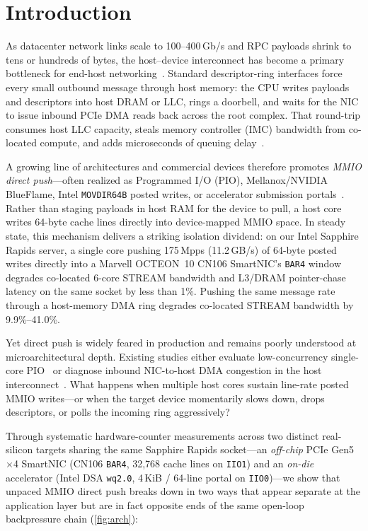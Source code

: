 \section{Introduction}
\label{sec:intro}

As datacenter network links scale to 100--400\,Gb/s and RPC payloads shrink to tens or hundreds of bytes, the host--device interconnect has become a primary bottleneck for end-host networking~\cite{neugebauer2018pcie,agarwal2023hostcc,vuppalapati2024hostnet,sadok2023enso}. Standard descriptor-ring interfaces force every small outbound message through host memory: the CPU writes payloads and descriptors into host DRAM or LLC, rings a doorbell, and waits for the NIC to issue inbound PCIe DMA reads back across the root complex. That round-trip consumes host LLC capacity, steals memory controller (IMC) bandwidth from co-located compute, and adds microseconds of queuing delay~\cite{farshin2020ddio,liu2025ceio}.

A growing line of architectures and commercial devices therefore promotes \emph{MMIO direct push}---often realized as Programmed I/O (PIO), Mellanox/NVIDIA BlueFlame, Intel \texttt{MOVDIR64B} posted writes, or accelerator submission portals~\cite{kalia2016rdma,liew2025hotos,ruzhanskaia2024pio,inteldsa2023}. Rather than staging payloads in host RAM for the device to pull, a host core writes 64-byte cache lines directly into device-mapped MMIO space. In steady state, this mechanism delivers a striking isolation dividend: on our Intel Sapphire Rapids server, a single core pushing 175\,Mpps (11.2\,GB/s) of 64-byte posted writes directly into a Marvell OCTEON~10 CN106 SmartNIC's \texttt{BAR4} window degrades co-located 6-core STREAM bandwidth and L3/DRAM pointer-chase latency on the same socket by less than 1\%. Pushing the same message rate through a host-memory DMA ring degrades co-located STREAM bandwidth by 9.9\%--41.0\%.

Yet direct push is widely feared in production and remains poorly understood at microarchitectural depth. Existing studies either evaluate low-concurrency single-core PIO~\cite{liew2025hotos,kalia2016rdma} or diagnose inbound NIC-to-host DMA congestion in the host interconnect~\cite{agarwal2023hostcc,vuppalapati2024hostnet,liu2023hostping}. What happens when multiple host cores sustain line-rate posted MMIO writes---or when the target device momentarily slows down, drops descriptors, or polls the incoming ring aggressively?

Through systematic hardware-counter measurements across two distinct real-silicon targets sharing the same Sapphire Rapids socket---an \emph{off-chip} PCIe Gen5\,$\times$4 SmartNIC (CN106 \texttt{BAR4}, 32,768 cache lines on \texttt{IIO1}) and an \emph{on-die} accelerator (Intel DSA \texttt{wq2.0}, 4\,KiB / 64-line portal on \texttt{IIO0})---we show that unpaced MMIO direct push breaks down in two ways that appear separate at the application layer but are in fact opposite ends of the same open-loop backpressure chain (\autoref{fig:arch}):


